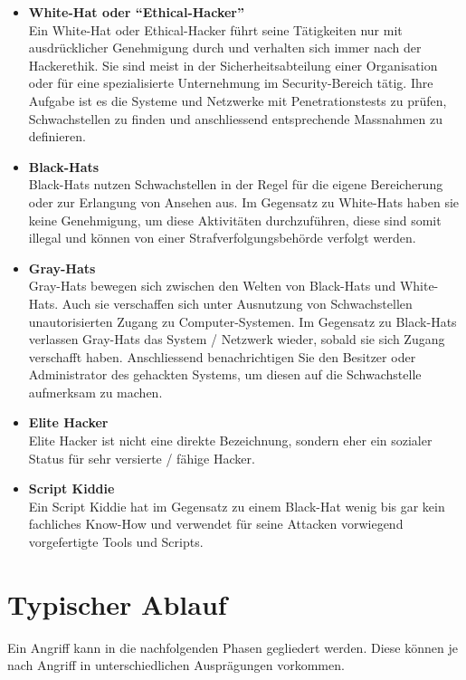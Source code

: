 \begin{itemize}
\item \textbf{White-Hat oder "`Ethical-Hacker"' }\\
Ein White-Hat oder Ethical-Hacker führt seine Tätigkeiten nur mit ausdrücklicher Genehmigung durch und verhalten sich immer nach der Hackerethik. Sie sind meist in der Sicherheitsabteilung einer Organisation oder für eine spezialisierte Unternehmung im Security-Bereich tätig. Ihre Aufgabe ist es die Systeme und Netzwerke mit Penetrationstests zu prüfen, Schwachstellen zu finden und anschliessend entsprechende Massnahmen zu definieren.

\item \textbf{Black-Hats} \\
Black-Hats nutzen Schwachstellen in der Regel für die eigene Bereicherung oder zur Erlangung von Ansehen aus. Im Gegensatz zu White-Hats haben sie keine Genehmigung, um diese Aktivitäten durchzuführen, diese sind somit illegal und können von einer Strafverfolgungsbehörde verfolgt werden.

\item \textbf{Gray-Hats} \\
Gray-Hats bewegen sich zwischen den Welten von Black-Hats und White-Hats. Auch sie verschaffen sich unter Ausnutzung von Schwachstellen unautorisierten Zugang zu Computer-Systemen. Im Gegensatz zu Black-Hats verlassen Gray-Hats das System / Netzwerk wieder, sobald sie sich Zugang verschafft haben. Anschliessend benachrichtigen Sie den Besitzer oder Administrator des gehackten Systems, um diesen auf die Schwachstelle aufmerksam zu machen.

\item \textbf{Elite Hacker} \\
Elite Hacker ist nicht eine direkte Bezeichnung, sondern eher ein sozialer Status für sehr versierte / fähige Hacker.

\item \textbf{Script Kiddie} \\
Ein Script Kiddie hat im Gegensatz zu einem Black-Hat wenig bis gar kein fachliches Know-How und verwendet für seine Attacken vorwiegend vorgefertigte Tools und Scripts.
\end{itemize}


\section{Typischer Ablauf}
Ein Angriff kann in die nachfolgenden Phasen gegliedert werden. Diese können je nach Angriff in unterschiedlichen Ausprägungen vorkommen.

